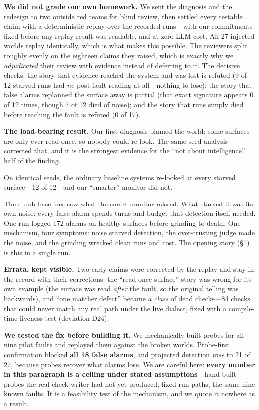 \documentclass[acmsmall,screen]{acmart}
\begin{document}
\textbf{We did not grade our own homework.} We sent the diagnosis and the
redesign to two outside red teams for blind review, then settled every testable
claim with a deterministic replay over the recorded runs---with our commitments
fixed before any replay result was readable, and at zero LLM cost. All 27
injected worlds replay identically, which is what makes this possible. The
reviewers split roughly evenly on the eighteen claims they raised, which is
exactly why we \emph{adjudicated} their review with evidence instead of
deferring to it. The decisive checks: the story that evidence reached the system
and was lost is refuted (9 of 12 starved runs had \emph{no} post-fault reading
at all---nothing to lose); the story that false alarms replanned the surface
away is partial (that exact signature appears 0 of 12 times, though 7 of 12 died
of noise); and the story that runs simply died before reaching the fault is
refuted (0 of 17).

\textbf{The load-bearing result.} Our first diagnosis blamed the world: some
surfaces are only ever read once, so nobody could re-look. The same-seed
analysis corrected that, and it is the strongest evidence for the ``not about
intelligence'' half of the finding.

On identical seeds, the ordinary baseline systems re-looked at every starved
surface---12 of 12---and our ``smarter'' monitor did not.

The dumb baselines saw what the smart monitor missed. What starved it was its
own noise: every false alarm spends turns and budget that detection itself
needed. One run logged 172 alarms on healthy surfaces before grinding to death.
One mechanism, four symptoms: noise starved detection, the over-trusting judge
made the noise, and the grinding wrecked clean runs and cost. The opening story
(\S1) is this in a single run.

\textbf{Errata, kept visible.} Two early claims were corrected by the replay and
stay in the record with their corrections: the ``read-once surface'' story was
wrong for its own example (the surface was read \emph{after} the fault, so the
original telling was backwards), and ``one matcher defect'' became a \emph{class}
of dead checks---84 checks that could never match any real path under the live
dialect, fixed with a compile-time liveness test (deviation D24).

\textbf{We tested the fix before building it.} We mechanically built probes for
all nine pilot faults and replayed them against the broken worlds. Probe-first
confirmation blocked \textbf{all 18 false alarms}, and projected detection
\emph{rose} to 21 of 27, because probes recover what alarms lose. We are careful
here: \textbf{every number in this paragraph is a ceiling under stated
assumptions}---hand-built probes the real check-writer had not yet produced,
fixed run paths, the same nine known faults. It is a feasibility test of the
mechanism, and we quote it nowhere as a result.
\end{document}
